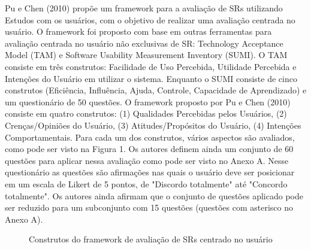 Pu e Chen (2010) propõe um framework para a avaliação de SRs utilizando Estudos com os usuários, com o objetivo de realizar uma avaliação centrada no usuário. O framework foi proposto com base em outras ferramentas para avaliação centrada no usuário não exclusivas de SR: Technology Acceptance Model (TAM) e Software Usability Measurement Inventory (SUMI). O TAM consiste em três construtos: Facilidade de Uso Percebida, Utilidade Percebida e Intenções do Usuário em utilizar o sistema. Enquanto o SUMI consiste de cinco construtos (Eficiência, Influência, Ajuda, Controle, Capacidade de Aprendizado) e um questionário de 50 questões.
O framework proposto por Pu e Chen (2010) consiste em quatro construtos: (1) Qualidades Percebidas pelos Usuários, (2) Crenças/Opiniões do Usuário, (3) Atitudes/Propósitos do Usuário, (4) Intenções Comportamentais. Para cada um dos construtos, vários aspectos são avaliados, como pode ser visto na Figura 1. Os autores definem ainda um conjunto de 60 questões para aplicar nessa avaliação como pode ser visto no Anexo A. Nesse questionário as questões são afirmações nas quais o usuário deve ser posicionar em um escala de Likert de 5 pontos, de "Discordo totalmente" até "Concordo totalmente". Os autores ainda afirmam que o conjunto de questões aplicado pode ser reduzido para um subconjunto com 15 questões (questões com asterisco no Anexo A).

\begin{figure}[htb]
  \caption{\label{resque-framework}Construtos do framework de avaliação de SRs centrado no usuário}
  \begin{center}
  \end{center}
\end{figure}

